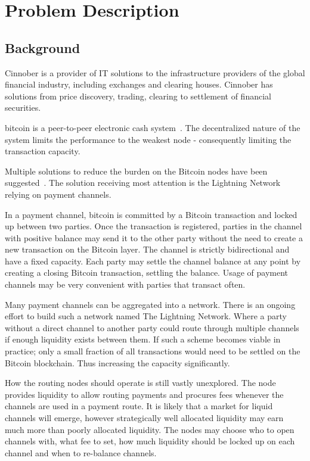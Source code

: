 \chapter{Problem Description}

\section{Background}
    \label{sec:background}

Cinnober is a provider of IT solutions to the infrastructure providers of the global financial industry, including exchanges and clearing houses. Cinnober has solutions from price discovery, trading, clearing to settlement of financial securities.

\gls{bitcoin} is a peer-to-peer electronic cash system~\cite{nakamoto:bitcoin}. The decentralized nature of the system limits the performance to the weakest node - consequently limiting the transaction capacity. 

Multiple solutions to reduce the burden on the Bitcoin nodes have been suggested~\cite{decker:wattenhofer:duplex, decker:russell:Osuntokun:eltoo, poon:dryja:lightning:network, blockstream:sidechain}. The solution receiving most attention is the \gls{Lightning Network} relying on payment channels.

In a payment channel, bitcoin is committed by a Bitcoin transaction and locked up between two parties. Once the transaction is registered, parties in the channel with positive balance may send it to the other party without the need to create a new transaction on the Bitcoin layer. The channel is strictly bidirectional and have a fixed capacity. Each party may settle the channel balance at any point by creating a closing Bitcoin transaction, settling the balance. Usage of payment channels may be very convenient with parties that transact often. 

Many payment channels can be aggregated into a network. There is an ongoing effort to build such a network named The Lightning Network. Where a party without a direct channel to another party could route through multiple channels if enough liquidity exists between them. If such a scheme becomes viable in practice;  only a small fraction of all transactions would need to be settled on the Bitcoin blockchain. Thus increasing the capacity significantly.

How the routing nodes should operate is still vastly unexplored. The node provides liquidity to allow routing payments and procures fees whenever the channels are used in a payment route. It is likely that a market for liquid channels will emerge, however strategically well allocated liquidity may earn much more than poorly allocated liquidity. The nodes may choose who to open channels with, what fee to set, how much liquidity should be locked up on each channel and when to re-balance channels.

